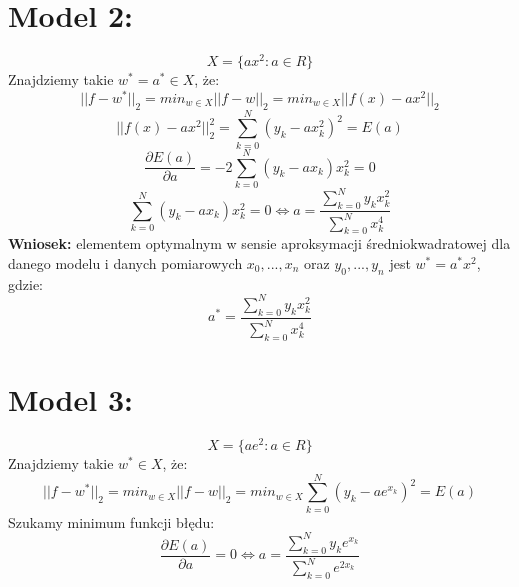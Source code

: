 \documentclass[12pt]{article}
\begin{document}
\section*{Model 2:}
$$ X = \{ax^2: a \in R\}$$
Znajdziemy takie $w^{*}= a^{*} \in X$, że:
$$||f-w^{*}||_2=min_{w \in X} ||f-w||_2 = min_{w \in X}||f(x)-ax^2||_2 $$
$$||f(x)-ax^2||^{2}_2 = \sum_{k=0}^{N} (y_k-ax_k^2)^2= E(a)  $$
$$\frac{\partial E(a)}{\partial a}=-2\sum_{k=0}^{N} (y_k-ax_k)x_k^2 =0$$
$$\sum_{k=0}^{N} (y_k-ax_k)x_k^2 =0 \Leftrightarrow a= \frac{\sum_{k=0}^{N} y_kx_k^2}{\sum_{k=0}^{N}x_k^4}$$
\textbf{Wniosek:} elementem optymalnym w sensie aproksymacji średniokwadratowej dla danego modelu i danych pomiarowych $x_0,...,x_n$ oraz $y_0,...,y_n$ jest $w^{*} = a^{*}x^2$, gdzie:
$$a^{*}= \frac{\sum_{k=0}^{N} y_kx_k^2}{\sum_{k=0}^{N}x_k^4}$$
\section*{Model 3:}
$$ X = \{ae^2: a \in R\}$$
Znajdziemy takie $w^{*}\in X$, że:
$$||f-w^{*}||_2=min_{w \in X} ||f-w||_2 = min_{w \in X}\sum_{k=0}^{N} (y_k-ae^{x_k})^2 = E(a) $$
Szukamy minimum funkcji błędu:
$$\frac{\partial E(a)}{\partial a}=0 \Leftrightarrow a =\frac{\sum_{k=0}^{N} y_ke^{x_k}}{\sum_{k=0}^{N} e^{2x_k}} $$
\newpage
\end{document}
